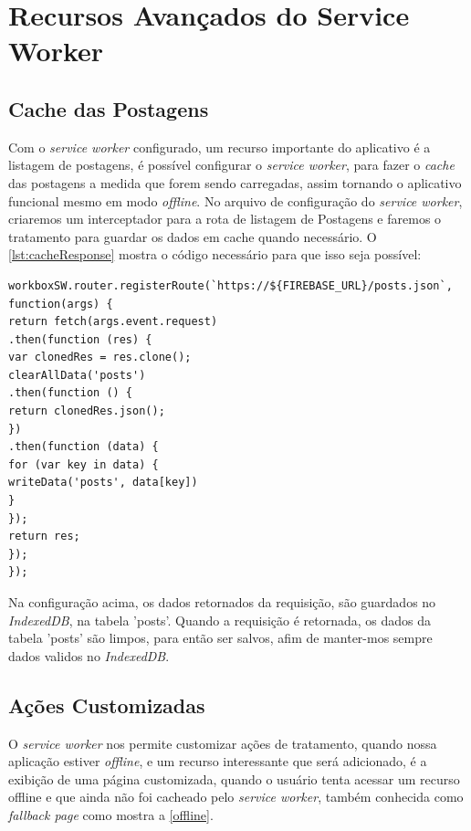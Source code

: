 \vspace{-0.75cm}
\begin{center}
\end{center}

\section{Recursos Avançados do Service Worker}
\subsection{Cache das Postagens}
Com o \textit{service worker} configurado, um recurso importante do aplicativo é a listagem de postagens, é possível configurar o \textit{service worker}, para fazer o \textit{cache} das postagens a medida que forem sendo carregadas, assim tornando o aplicativo funcional mesmo em modo \textit{offline}. No arquivo de configuração do \textit{service worker}, criaremos um interceptador para a rota de listagem de Postagens e faremos o tratamento para guardar os dados em cache quando necessário. O \autoref{lst:cacheResponse} mostra o código necessário para que isso seja possível:
\begin{lstlisting}[frame=single,label=lst:cacheResponse,caption=Armazendo Post, basicstyle=\footnotesize]
workboxSW.router.registerRoute(`https://${FIREBASE_URL}/posts.json`, function(args) {
return fetch(args.event.request)
.then(function (res) {
var clonedRes = res.clone();
clearAllData('posts')
.then(function () {
return clonedRes.json();
})
.then(function (data) {
for (var key in data) {
writeData('posts', data[key])
}
});
return res;
});
});
\end{lstlisting}

\vspace{-0.75cm}
\begin{center}
\end{center}

Na configuração acima, os dados retornados da requisição, são guardados no \textit{IndexedDB}, na tabela 'posts'. Quando a requisição é retornada, os dados da tabela 'posts' são limpos, para então ser salvos, afim de manter-mos sempre dados validos no \textit{IndexedDB}.

\subsection{Ações Customizadas}
O \textit{service worker} nos permite customizar ações de tratamento, quando nossa aplicação estiver \textit{offline}, e um recurso interessante que será adicionado, é a exibição de uma página customizada, quando o usuário tenta acessar um recurso offline e que ainda não foi cacheado pelo \textit{service worker}, também conhecida como \textit{fallback page} como mostra a \autoref{offline}.

